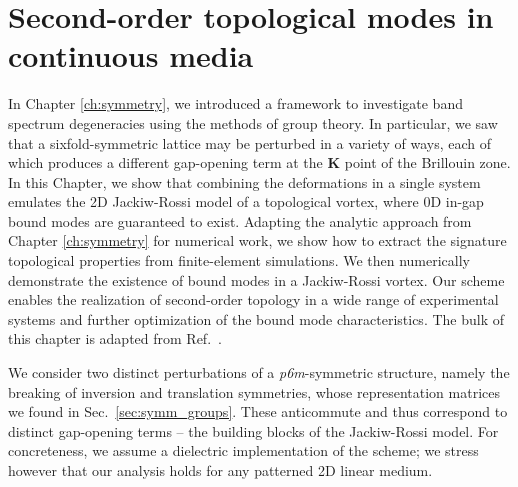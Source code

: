 

\chapter{Second-order topological modes in continuous media} \label{ch:hoti} 


\begin{chapterabstract}
	In Chapter \ref{ch:symmetry}, we introduced a framework to investigate band spectrum degeneracies using the methods of group theory.	
	In particular, we saw that a sixfold-symmetric lattice may be perturbed in a variety of ways, each of which produces a different gap-opening term at the $\boldsymbol{K}$ point of the Brillouin zone. In this Chapter, we show that combining the deformations in a single system emulates the 2D Jackiw-Rossi model of a topological vortex, where 0D in-gap bound modes are guaranteed to exist. Adapting the analytic approach from Chapter \ref{ch:symmetry} for numerical work, we show how to extract the signature topological properties from finite-element simulations. We then numerically demonstrate the existence of bound modes in a Jackiw-Rossi vortex. Our scheme enables the realization of second-order topology in a wide range of experimental systems and further optimization of the bound mode characteristics. 
	\tcblower
	The bulk of this chapter is adapted from Ref.~\cite{Kosata_2021}.
\end{chapterabstract}

We consider two distinct perturbations of a \textit{p6m}-symmetric structure, namely the breaking of inversion and translation symmetries, whose representation matrices we found in Sec.~\ref{sec:symm_groups}. These anticommute and thus correspond to distinct gap-opening terms -- the building blocks of the Jackiw-Rossi model. For concreteness, we assume a dielectric implementation of the scheme; we stress however that our analysis holds for any patterned 2D linear medium. 

